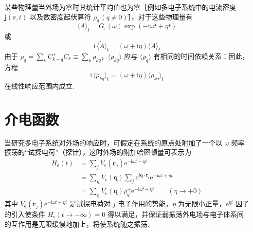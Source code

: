 某些物理量当外场为零时其统计平均值也为零［例如多电子系统中的电流密度 $\boldsymbol{j}(\boldsymbol{r},t)$ 以及数密度起伏算符 $\rho_{q}\,(q\neq 0)$］，对于这些物理量有
\begin{equation}
  \langle A\rangle_{t}=G_{\mathrm{r}}(\omega)
  \exp\left(-\mathrm{i}\omega t+\eta t\right)
\end{equation}
或
\begin{equation}
  \mathrm{i}\,\langle\dot{A}\rangle_{t}
  =\left(\omega+\mathrm{i}\eta\right)\langle A\rangle_{t}
\end{equation}
由于 $\rho_{q}=\displaystyle\sum_{k}C_{k-q}^{+}C_{k}\equiv\sum_{k}\rho_{kq}$，$\langle\rho_{kq}\rangle$ 应与 $\langle\rho_{q}\rangle$ 有相同的时间依赖关系：因此，方程
\begin{equation}
  \mathrm{i}\,\langle\dot{\rho}_{kq}\rangle_{t}
  =\left(\omega+\mathrm{i}\eta\right)\langle\rho_{kq}\rangle_{t}
\end{equation}
在线性响应范围内成立.

\section{介电函数}

当研究多电子系统对外场的响应时，可假定在系统的原点处附加了一个以 $\omega$ 频率振荡的“试探电荷”（探针），这时外场的附加哈密顿量可表示为
\begin{equation}
\begin{aligned}
  H_{\mathrm{e}}(t)&=\sum_{j}V_{\mathrm{e}}(\boldsymbol{r}_{j})
  \mathrm{e}^{-\mathrm{i}\omega t+\eta t}\\
  &=\sum_{\boldsymbol{q}}V_{\mathrm{e}}(\boldsymbol{q})\sum_{j}
  \mathrm{e}^{\mathrm{i}\boldsymbol{q}\cdot\boldsymbol{r}_{j}}
  \mathrm{e}^{-\mathrm{i}\omega t+\eta t}\\
  &=\sum_{\boldsymbol{q}}V_{\mathrm{e}}(\boldsymbol{q})\rho_{q}^{+}
  \mathrm{e}^{-\mathrm{i}\omega t+\eta t}\qquad\left(\eta\to+0\right)
\end{aligned}
\end{equation}
其中 $V_{\mathrm{e}}(\boldsymbol{r}_{j})\mathrm{e}^{-\mathrm{i}\omega t+\eta t}$ 是试探电荷对 $j$ 电子作用的势能，$\eta$ 为无限小正量，$\mathrm{e}^{\eta t}$ 因子的引入使条件 $H_{\mathrm{e}}(t\to-\infty)=0$ 得以满足，并保证弱振荡外电场与电子体系间的互作用是无限缓慢地加上，将使系统随之振荡.

